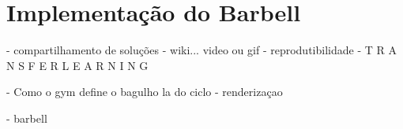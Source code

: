 \documentclass[cic,tc]{iiufrgs}
\newcommand\bruno[1]{\textcolor{magenta}{#1}}
\begin{document}
\section{Implementação do Barbell}
\blindtext[2]
%

 - compartilhamento de soluções
 - wiki... video ou gif
 - reprodutibilidade
 - T R A N S F E R    L E A R N I N G

 - Como o gym define o bagulho la do ciclo
 - renderizaçao

 - barbell

%
\end{document}
